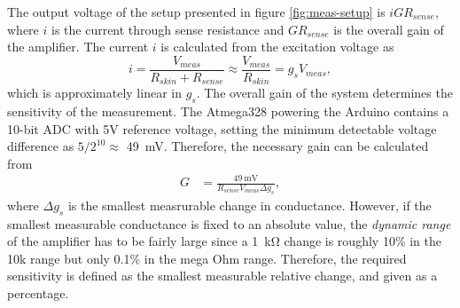 \documentclass[a4paper,11pt]{article}
\begin{document}
The output voltage of the setup presented in figure
\ref{fig:meas-setup} is $iGR_{sense}$, where $i$ is the current
through sense resistance and $GR_{sense}$ is the overall gain of the
amplifier. The current $i$ is calculated from the excitation voltage
as
\begin{equation}
  i = \frac{V_{meas}}{R_{skin} + R_{sense}} \approx \frac{V_{meas}}{R_{skin}} =
    g_sV_{meas},
\end{equation}
which is approximately linear in $g_s$. The overall gain of the system
determines the sensitivity of the measurement. The Atmega328 powering
the Arduino contains a 10-bit ADC with 5V reference voltage, setting
the minimum detectable voltage difference as $5/2^{10} \approx$
\SI{49}{\milli\volt}. Therefore, the necessary gain can be calculated
from 
\begin{align}
  G &= \frac{\SI{49}{\milli\volt}}{R_{sense}V_{meas} \Delta g_s},
\end{align}
where $\Delta g_s$ is the smallest measrurable change in
conductance. However, if the smallest measurable conductance is fixed
to an absolute value, the \emph{dynamic range} of the amplifier has to
be fairly large since a \SI{1}{\kilo\ohm} change is roughly 10\% in
the 10k range but only 0.1\% in the mega Ohm range. Therefore, the
required sensitivity is defined as the smallest measurable relative
change, and given as a percentage.
\end{document}
